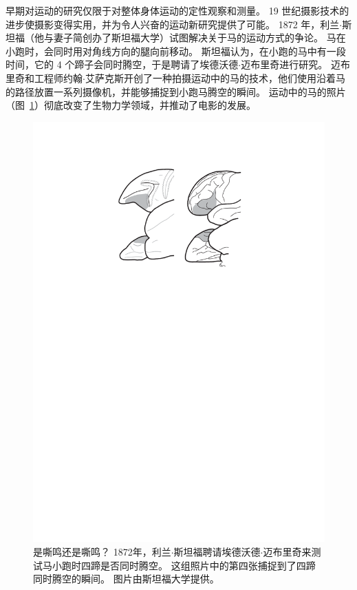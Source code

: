 早期对运动的研究仅限于对整体身体运动的定性观察和测量。
19 世纪摄影技术的进步使摄影变得实用，并为令人兴奋的运动新研究提供了可能。
1872 年，利兰$\cdot$斯坦福（他与妻子简创办了斯坦福大学）试图解决关于马的运动方式的争论。
马在小跑时，会同时用对角线方向的腿向前移动。
斯坦福认为，在小跑的马中有一段时间，它的 4 个蹄子会同时腾空，于是聘请了埃德沃德$\cdot$迈布里奇进行研究。
迈布里奇和工程师约翰$\cdot$艾萨克斯开创了一种拍摄运动中的马的技术，他们使用沿着马的路径放置一系列摄像机，并能够捕捉到小跑马腾空的瞬间。
运动中的马的照片（图~\ref{fig:7_1}）彻底改变了生物力学领域，并推动了电影的发展。


\begin{figure}[!htb]
	\centering
	\includegraphics[width=1.0\linewidth]{chap7/7_1}
	\caption{是嘶鸣还是嘶鸣？
		1872年，利兰$\cdot$斯坦福聘请埃德沃德$\cdot$迈布里奇来测试马小跑时四蹄是否同时腾空。
		这组照片中的第四张捕捉到了四蹄同时腾空的瞬间。
		图片由斯坦福大学提供。 \label{fig:7_1}}
\end{figure}


